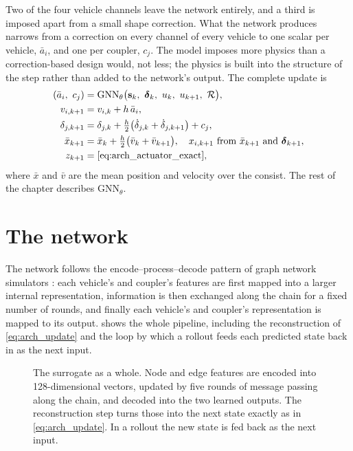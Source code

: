 Two of the four vehicle channels leave the network entirely, and a third is imposed apart from a small shape correction. What the network produces narrows from a correction on every channel of every vehicle to one scalar per vehicle, $\bar a_i$, and one per coupler, $c_j$. The model imposes more physics than a correction-based design would, not less; the physics is built into the structure of the step rather than added to the network's output. The complete update is
\begin{equation}
\begin{aligned}
    (\bar a_i,\ c_j) &= \mathrm{GNN}_\theta\bigl(\mathbf{s}_k,\ \boldsymbol{\delta}_k,\ u_k,\ u_{k+1},\ \mathcal{R}\bigr), \\
    v_{i,k+1} &= v_{i,k} + h\,\bar a_i, \\
    \delta_{j,k+1} &= \delta_{j,k} + \tfrac{h}{2}\bigl(\dot\delta_{j,k} + \dot\delta_{j,k+1}\bigr) + c_j, \\
    \bar x_{k+1} &= \bar x_k + \tfrac{h}{2}\bigl(\bar v_k + \bar v_{k+1}\bigr), \quad x_{i,k+1} \text{ from } \bar x_{k+1} \text{ and } \boldsymbol{\delta}_{k+1}, \\
    z_{k+1} &= \text{\cref{eq:arch_actuator_exact}},
\end{aligned}
\label{eq:arch_update}
\end{equation}
where $\bar x$ and $\bar v$ are the mean position and velocity over the consist. The rest of the chapter describes $\mathrm{GNN}_\theta$.

\section{The network}
\label{sec:arch_network}

The network follows the encode--process--decode pattern of graph network simulators \cite{sanchez2020gns}: each vehicle's and coupler's features are first mapped into a larger internal representation, information is then exchanged along the chain for a fixed number of rounds, and finally each vehicle's and coupler's representation is mapped to its output.  shows the whole pipeline, including the reconstruction of \cref{eq:arch_update} and the loop by which a rollout feeds each predicted state back in as the next input.

\begin{figure}[htbp]
    \centering
    \resizebox{\textwidth}{!}{}
    \caption{The surrogate as a whole. Node and edge features are encoded into 128-dimensional vectors, updated by five rounds of message passing along the chain, and decoded into the two learned outputs. The reconstruction step turns those into the next state exactly as in \cref{eq:arch_update}. In a rollout the new state is fed back as the next input.}
    \label{fig:arch_overview}
\end{figure}


